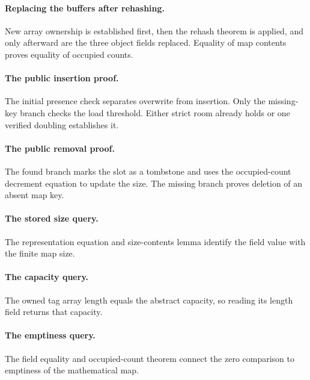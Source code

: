 \documentclass[11pt]{article}
\begin{document}
\paragraph{Replacing the buffers after rehashing.} New array ownership is established first, then the rehash theorem is applied, and only afterward are the three object fields replaced. Equality of map contents proves equality of occupied counts.



\paragraph{The public insertion proof.} The initial presence check separates overwrite from insertion. Only the missing-key branch checks the load threshold. Either strict room already holds or one verified doubling establishes it.



\paragraph{The public removal proof.} The found branch marks the slot as a tombstone and uses the occupied-count decrement equation to update the size. The missing branch proves deletion of an absent map key.



\paragraph{The stored size query.} The representation equation and size-contents lemma identify the field value with the finite map size.



\paragraph{The capacity query.} The owned tag array length equals the abstract capacity, so reading its length field returns that capacity.



\paragraph{The emptiness query.} The field equality and occupied-count theorem connect the zero comparison to emptiness of the mathematical map.
\end{document}
